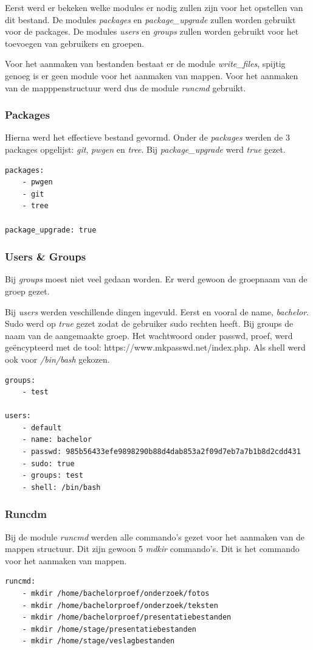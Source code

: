 Eerst werd er bekeken welke modules er nodig zullen zijn voor het opstellen van dit bestand. De modules \textit{packages} en \textit{package\_upgrade} zullen worden gebruikt voor de packages. De modules \textit{users} en \textit{groups} zullen worden gebruikt voor het toevoegen van gebruikers en groepen.

Voor het aanmaken van bestanden bestaat er de module \textit{write\_files}, spijtig genoeg is er geen module voor het aanmaken van mappen. Voor het aanmaken van de mapppenstructuur werd dus de module \textit{runcmd} gebruikt.

\subsubsection{Packages}
Hierna werd het effectieve bestand gevormd. Onder de \textit{packages} werden de 3 packages opgelijst: \textit{git}, \textit{pwgen} en \textit{tree}. Bij \textit{package\_upgrade} werd \textit{true} gezet. 
\begin{lstlisting}
packages:
    - pwgen
    - git
    - tree

package_upgrade: true
\end{lstlisting}

\subsubsection{Users \& Groups}
Bij \textit{groups} moest niet veel gedaan worden. Er werd gewoon de groepnaam van de groep gezet.

Bij \textit{users} werden veschillende dingen ingevuld. Eerst en vooral de name, \textit{bachelor}. Sudo werd op \textit{true} gezet zodat de gebruiker sudo rechten heeft. Bij groups de naam van de aangemaakte groep. Het wachtwoord onder passwd, proef, werd geëncypteerd met de tool: https://www.mkpasswd.net/index.php. Als shell werd ook voor \textit{/bin/bash} gekozen.
\begin{lstlisting}
groups:
    - test

users:
    - default
    - name: bachelor
    - passwd: 985b56433efe9898290b88d4dab853a2f09d7eb7a7b1b8d2cdd431
    - sudo: true
    - groups: test
    - shell: /bin/bash
\end{lstlisting}


\subsubsection{Runcdm}
Bij de module \textit{runcmd} werden alle commando's gezet voor het aanmaken van de mappen structuur. Dit zijn gewoon 5 \textit{mdkir} commando's. Dit is het commando voor het aanmaken van mappen.
\begin{lstlisting}
runcmd:
    - mkdir /home/bachelorproef/onderzoek/fotos
    - mkdir /home/bachelorproef/onderzoek/teksten
    - mkdir /home/bachelorproef/presentatiebestanden
    - mkdir /home/stage/presentatiebestanden
    - mkdir /home/stage/veslagbestanden
\end{lstlisting}

